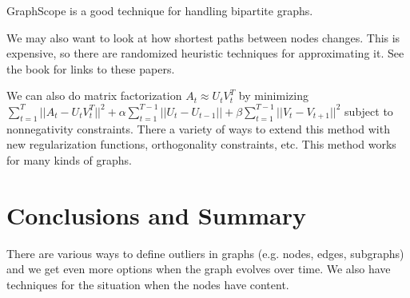 \documentclass[a4paper]{article}
\begin{document}
GraphScope is a good technique for handling bipartite graphs.

We may also want to look at how shortest paths between nodes changes. This
is expensive, so there are randomized heuristic techniques for approximating
it. See the book for links to these papers.

We can also do matrix factorization $A_t \approx U_tV_t^T$ by minimizing
$\sum_{t=1}^{T}{||A_t - U_tV_t^T||^2} + \alpha \sum_{t=1}^{T-1}{||U_t - U_{t-1}||}
+ \beta \sum_{t=1}^{T-1}{||V_t - V_{t+1}||^2}$ subject to nonnegativity constraints.
There a variety of ways to extend this method with new regularization functions,
orthogonality constraints, etc. This method works for many kinds of graphs.

\section{Conclusions and Summary}
There are various ways to define outliers in graphs (e.g. nodes, edges, subgraphs)
and we get even more options when the graph evolves over time. We also have techniques
for the situation when the nodes have content.
\end{document}
